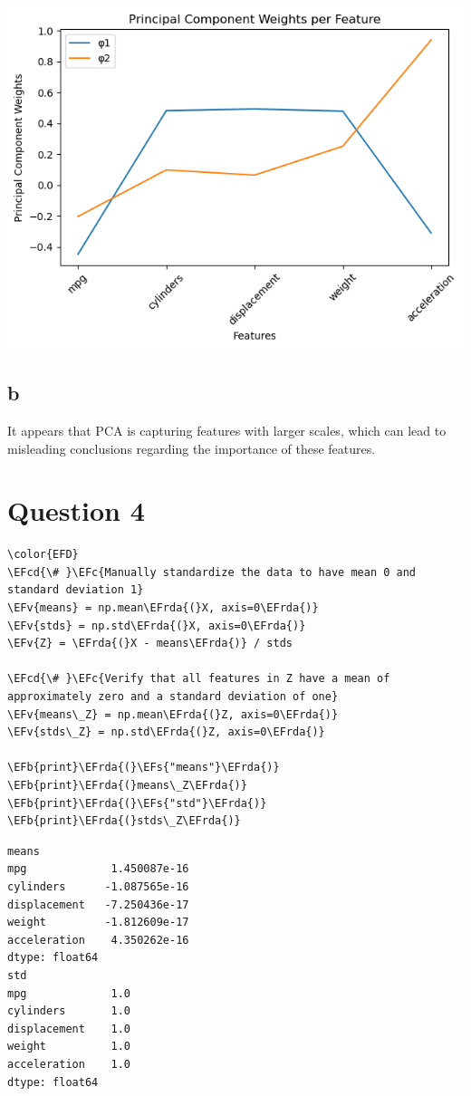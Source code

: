 \documentclass[11pt]{article}
\newcommand{\EFc}[1]{\textcolor{EFc}{#1}} %
\newcommand{\EFcd}[1]{\textcolor{EFcd}{#1}} %
\newcommand{\EFs}[1]{\textcolor{EFs}{#1}} %
\newcommand{\EFb}[1]{\textcolor{EFb}{#1}} %
\newcommand{\EFv}[1]{\textcolor{EFv}{#1}} %
\newcommand{\EFrda}[1]{\textcolor{EFrda}{#1}} %
\begin{document}
\begin{center}
\includegraphics[width=.9\linewidth]{plot.png}
\end{center}

\subsection*{b}
\label{sec:org63392af}
It appears that PCA is capturing features with larger scales, which can lead to misleading conclusions regarding the importance of these features.
\section*{Question 4}
\label{sec:org0bf7c0b}


\begin{Code}
\begin{Verbatim}
\color{EFD}
\EFcd{\# }\EFc{Manually standardize the data to have mean 0 and standard deviation 1}
\EFv{means} = np.mean\EFrda{(}X, axis=0\EFrda{)}
\EFv{stds} = np.std\EFrda{(}X, axis=0\EFrda{)}
\EFv{Z} = \EFrda{(}X - means\EFrda{)} / stds

\EFcd{\# }\EFc{Verify that all features in Z have a mean of approximately zero and a standard deviation of one}
\EFv{means\_Z} = np.mean\EFrda{(}Z, axis=0\EFrda{)}
\EFv{stds\_Z} = np.std\EFrda{(}Z, axis=0\EFrda{)}

\EFb{print}\EFrda{(}\EFs{"means"}\EFrda{)}
\EFb{print}\EFrda{(}means\_Z\EFrda{)}
\EFb{print}\EFrda{(}\EFs{"std"}\EFrda{)}
\EFb{print}\EFrda{(}stds\_Z\EFrda{)}
\end{Verbatim}
\end{Code}

\begin{verbatim}
means
mpg             1.450087e-16
cylinders      -1.087565e-16
displacement   -7.250436e-17
weight         -1.812609e-17
acceleration    4.350262e-16
dtype: float64
std
mpg             1.0
cylinders       1.0
displacement    1.0
weight          1.0
acceleration    1.0
dtype: float64
\end{verbatim}
\end{document}
